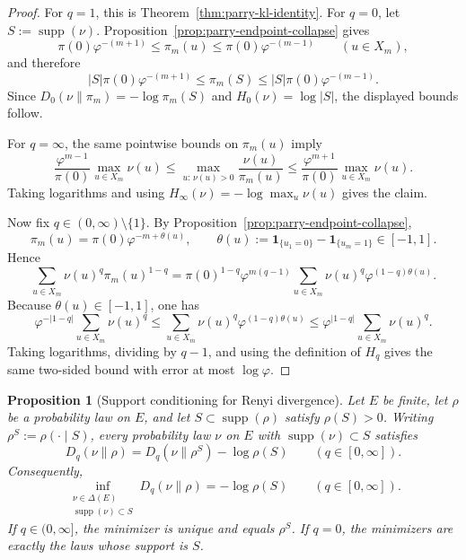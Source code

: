 \documentclass[11pt,letterpaper]{article}
\numberwithin{equation}{section}
\theoremstyle{plain}
\newtheorem{proposition}[theorem]{Proposition}
\theoremstyle{definition}
\theoremstyle{remark}
\DeclareMathOperator{\supp}{supp}
\begin{document}
\begin{proof}
For \(q=1\), this is Theorem~\ref{thm:parry-kl-identity}. For \(q=0\), let
\(S:=\supp(\nu)\). Proposition~\ref{prop:parry-endpoint-collapse} gives
\[
\pi(0)\varphi^{-(m+1)}
\le
\pi_m(u)
\le
\pi(0)\varphi^{-(m-1)}
\qquad (u\in X_m),
\]
and therefore
\[
|S|\pi(0)\varphi^{-(m+1)}
\le
\pi_m(S)
\le
|S|\pi(0)\varphi^{-(m-1)}.
\]
Since \(D_0(\nu\|\pi_m)=-\log \pi_m(S)\) and \(H_0(\nu)=\log|S|\), the
displayed bounds follow.

For \(q=\infty\), the same pointwise bounds on \(\pi_m(u)\) imply
\[
\frac{\varphi^{m-1}}{\pi(0)}\max_{u\in X_m}\nu(u)
\le
\max_{u:\,\nu(u)>0}\frac{\nu(u)}{\pi_m(u)}
\le
\frac{\varphi^{m+1}}{\pi(0)}\max_{u\in X_m}\nu(u).
\]
Taking logarithms and using \(H_\infty(\nu)=-\log\max_u \nu(u)\) gives the
claim.

Now fix \(q\in(0,\infty)\setminus\{1\}\). By
Proposition~\ref{prop:parry-endpoint-collapse},
\[
\pi_m(u)
=
\pi(0)\varphi^{-m+\theta(u)},
\qquad
\theta(u):=\mathbf{1}_{\{u_1=0\}}-\mathbf{1}_{\{u_m=1\}}\in[-1,1].
\]
Hence
\[
\sum_{u\in X_m}\nu(u)^q\pi_m(u)^{1-q}
=
\pi(0)^{1-q}\varphi^{m(q-1)}
\sum_{u\in X_m}\nu(u)^q\varphi^{(1-q)\theta(u)}.
\]
Because \(\theta(u)\in[-1,1]\), one has
\[
\varphi^{-|1-q|}\sum_{u\in X_m}\nu(u)^q
\le
\sum_{u\in X_m}\nu(u)^q\varphi^{(1-q)\theta(u)}
\le
\varphi^{|1-q|}\sum_{u\in X_m}\nu(u)^q.
\]
Taking logarithms, dividing by \(q-1\), and using the definition of \(H_q\)
gives the same two-sided bound with error at most \(\log\varphi\).
\end{proof}

\begin{proposition}[Support conditioning for Renyi divergence]
\label{prop:renyi-support-conditioning}
Let \(E\) be finite, let \(\rho\) be a probability law on \(E\), and let
\(S\subset \supp(\rho)\) satisfy \(\rho(S)>0\). Writing
\(\rho^S:=\rho(\cdot\mid S)\), every probability law \(\nu\) on \(E\) with
\(\supp(\nu)\subset S\) satisfies
\[
D_q(\nu\|\rho)
=
D_q(\nu\|\rho^S)-\log \rho(S)
\qquad (q\in[0,\infty]).
\]
Consequently,
\[
\inf_{\substack{\nu\in\Delta(E)\\ \supp(\nu)\subset S}} D_q(\nu\|\rho)
=
-\log \rho(S)
\qquad (q\in[0,\infty]).
\]
If \(q\in(0,\infty]\), the minimizer is unique and equals \(\rho^S\). If
\(q=0\), the minimizers are exactly the laws whose support is \(S\).
\end{proposition}
\end{document}
